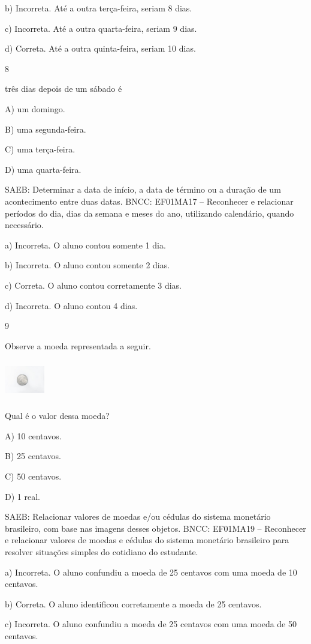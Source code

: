 \begin{itemize}
\begin{itemize}
b) Incorreta. Até a outra terça-feira, seriam 8 dias.

c) Incorreta. Até a outra quarta-feira, seriam 9 dias.

d) Correta. Até a outra quinta-feira, seriam 10 dias.

\num{8}

três dias depois de um sábado é

A) um domingo.

B) uma segunda-feira.

C) uma terça-feira.

D) uma quarta-feira.

SAEB: Determinar a data de início, a data de término ou a
duração de um acontecimento entre duas datas.
BNCC: EF01MA17 -- Reconhecer e relacionar períodos do dia, dias da semana
e meses do ano, utilizando calendário, quando necessário.

a) Incorreta. O aluno contou somente 1 dia.

b) Incorreta. O aluno contou somente 2 dias.

c) Correta. O aluno contou corretamente 3 dias.

d) Incorreta. O aluno contou 4 dias.

\num{9}

Observe a moeda representada a seguir.

\includegraphics[width=0.69044in,height=0.66964in]{media/image64.jpg}

Qual é o valor dessa moeda?

A) 10 centavos.

B) 25 centavos.

C) 50 centavos.

D) 1 real.

SAEB: Relacionar valores de moedas e/ou cédulas do sistema
monetário brasileiro, com base nas imagens desses objetos.
BNCC: EF01MA19 -- Reconhecer e relacionar valores de moedas e cédulas do
sistema monetário brasileiro para resolver situações simples do
cotidiano do estudante.

a) Incorreta. O aluno confundiu a moeda de 25 centavos com uma moeda de
10 centavos.

b) Correta. O aluno identificou corretamente a moeda de 25 centavos.

c) Incorreta. O aluno confundiu a moeda de 25 centavos com uma moeda de
50 centavos.


\end{itemize}
\end{itemize}
